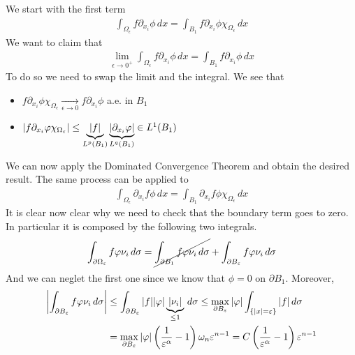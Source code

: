 We start with the first term
\[
    \begin{split}
        \int_{\Omega_\epsilon} f \partial_{x_i} \phi \, dx = \int_{B_1} f \partial_{x_i} \phi \chi_{\Omega_\epsilon} \, dx
    \end{split}
\]
We want to claim that
\[
    \begin{split}
        \lim_{\epsilon \to 0^+} \int_{\Omega_\epsilon} f \partial_{x_i} \phi \, dx = \int_{B_1} f \partial_{x_i} \phi \, dx
    \end{split}
\]
To do so we need to swap the limit and the integral. We see that
\begin{itemize}
    \item \(f \partial_{x_i} \phi \chi_{\Omega_\epsilon} \underset{\epsilon \to 0}{\longrightarrow} f \partial_{x_i} \phi\) a.e. in \(B_1\)
    \item \(\abs{f \partial_{x_i} \phi \chi_{\Omega_\epsilon}} \leq \underbrace{\abs{f}}_{L^p(B_1)} \underbrace{\abs{\partial_{x_i} \phi}}_{L^q(B_1)} \in L^1(B_1)\)
\end{itemize}
We can now apply the Dominated Convergence Theorem and obtain the desired result.
The same process can be applied to
\[
    \begin{split}
        \int_{\Omega_\epsilon} \partial_{x_i} f \phi \, dx = \int_{B_1} \partial_{x_i} f \phi \chi_{\Omega_\epsilon} \, dx
    \end{split}
\]
It is clear now clear why we need to check that the boundary term goes to zero.
In particular it is composed by the following two integrals.
\[
    \begin{split}
        \int_{\partial\Omega_\epsilon} f \phi \nu_i \, d\sigma = \cancel{\int_{\partial B_1} f \phi \nu_i \, d\sigma} + \int_{\partial B_\epsilon} f \phi \nu_i \, d\sigma
    \end{split}
\]
And we can neglet the first one since we know that $\phi = 0$ on $\partial
    B_1$. Moreover,
\begin{equation}\label{eq:boundary_term}
    \begin{split}
        \abs{\int_{\partial B_\epsilon} f \phi \nu_i \, d\sigma} & \leq \int_{\partial B_\epsilon} \abs{f} \abs{\phi} \underbrace{\abs{\nu_i}}_{\leq 1} \, d\sigma \leq \max_{\partial B_\epsilon} \abs{\phi} \int_{\{ \abs{x} = \epsilon \}} \abs{f} \, d\sigma \\
                                                                 & = \max_{\partial B_\epsilon} \abs{\phi} \left(\frac{1}{\epsilon^\alpha}-1\right) \omega_n \epsilon^{n-1} = C \left(\frac{1}{\epsilon^\alpha}-1\right) \epsilon^{n-1}
    \end{split}
\end{equation}

